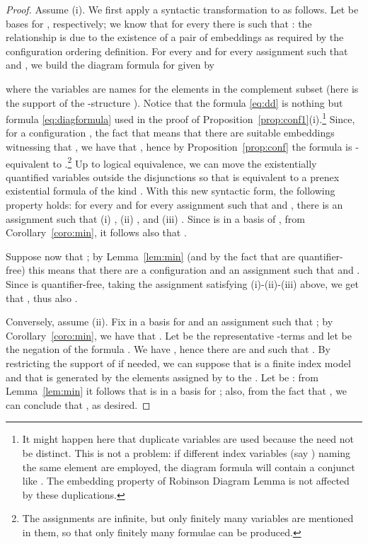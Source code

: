 \documentclass{LMCS}
\theoremstyle{plain}\newtheorem{assumption}[thm]{Assumption}
\theoremstyle{plain}\newtheorem{proposition}[thm]{Proposition}
\theoremstyle{plain}\newtheorem{property}[thm]{Property}
\theoremstyle{plain}\newtheorem{example}[thm]{Example}
\theoremstyle{plain}\newtheorem{claim}[thm]{Claim}
\theoremstyle{plain}\newtheorem{lemma}[thm]{Lemma}
\begin{document}
\begin{proof}
  Assume (i). We first apply a syntactic transformation to  as
  follows.  Let  be bases for , respectively; we know
  that for every  there is 
  such that : the relationship  is due to the
  existence of a pair of embeddings  as required by
  the configuration ordering definition. For every  and for
  every assignment  such that  and
  , we build the diagram
  formula  for  given by
  
    where the variables  are names for the elements in the
    complement subset 
    (here  is the support of the -structure
    ).  Notice that the formula \eqref{eq:dd} is nothing but
    formula \eqref{eq:diagformula} used in the proof of
    Proposition~\ref{prop:conf1}(i).\footnote{It might happen here
      that duplicate variables are used because the 
      need not be distinct. This is not a problem: if different index
      variables (say ) naming the same element are employed,
      the diagram formula will contain a conjunct like .  The
      embedding property of Robinson Diagram Lemma is not affected by
      these duplications.  } Since, for a configuration , the fact
    that  means that there are
    suitable embeddings witnessing that , we have that
    , hence by Proposition~\ref{prop:conf} the
    formula  is -equivalent to .\footnote{The assignments are infinite, but only
      finitely many variables are mentioned in them, so that only
      finitely many formulae  can be produced.}  Up to
    logical equivalence, we can move the existentially quantified
    variables outside the disjunctions so that  is equivalent to a
    prenex existential formula of the kind . With this new syntactic form, the following property holds:
    for every  and for every assignment  such that
     and , there is an assignment  such that (i)
    ,
    (ii) , and (iii)
    . Since  is in a basis of , from
    Corollary~\ref{coro:min}, it follows also that .

    Suppose now that ; by Lemma~\ref{lem:min} (and by the
    fact that  are quantifier-free) this means that
    there are a configuration  and an assignment
     such that  and .  Since  is quantifier-free, taking the
    assignment  satisfying (i)-(ii)-(iii) above, we get
    that ,
    thus also .

    Conversely, assume (ii). Fix  in a basis  for 
    and an assignment  such that ; by
    Corollary~\ref{coro:min}, we have that .  Let  be the representative
    -terms and let  be
    the negation of the formula .
We have , hence there are  and  such
    that . By restricting the support of  if
    needed, we can suppose that  is a finite index model and that
     is generated by the elements assigned by  to
    the .  Let  be : from
    Lemma~\ref{lem:min} it follows that  is in a basis for ;
    also, from the fact that , we can conclude that , as desired.
\end{proof}
\end{document}
